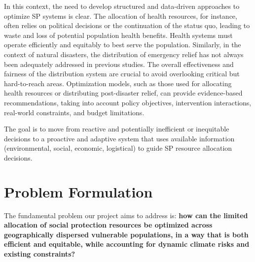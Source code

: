 \documentclass[letterpaper]{article}
\begin{document}
In this context, the need to develop structured and data-driven
approaches to optimize SP systems is clear. The allocation of health
resources, for instance, often relies on political decisions or the
continuation of the status quo, leading to waste and loss of
potential population health benefits. Health systems must operate
efficiently and equitably to best serve the population. Similarly,
in the context of natural disasters, the distribution of emergency
relief has not always been adequately addressed in previous studies.
The overall effectiveness and fairness of the distribution system
are crucial to avoid overlooking critical but hard-to-reach areas.
Optimization models, such as those used for allocating health
resources or distributing post-disaster relief, can provide
evidence-based recommendations, taking into account policy
objectives, intervention interactions, real-world constraints, and
budget limitations.

The goal is to move from reactive and potentially inefficient or
inequitable decisions to a proactive and adaptive system that uses
available information (environmental, social, economic, logistical)
to guide SP resource allocation decisions.

\section{Problem Formulation}
The fundamental problem our project aims to address is:
\textbf{how can the limited allocation of social protection
    resources be optimized across geographically dispersed vulnerable
    populations, in a way that is both efficient and equitable, while
    accounting for dynamic climate risks and existing constraints?}
\end{document}
